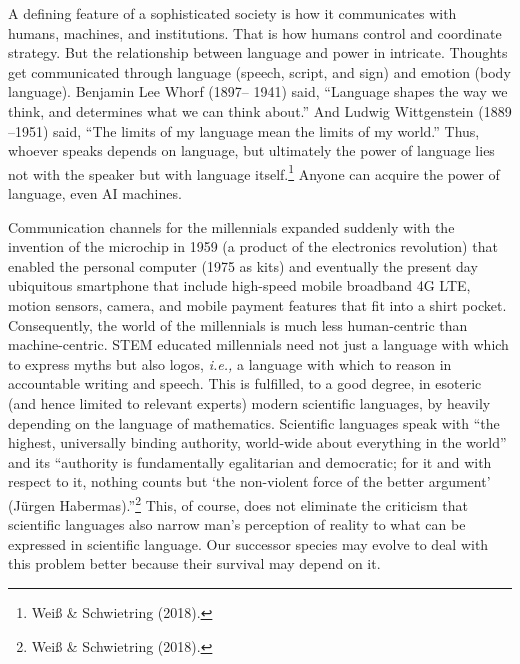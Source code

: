 \begin{multicols}{2}
A defining feature of a sophisticated society is how it communicates with humans, machines, and institutions. That is how humans control and coordinate strategy. But the relationship between language and power in intricate. Thoughts get communicated through language (speech, script, and sign) and emotion (body language). Benjamin Lee Whorf (1897– 1941) said, “Language shapes the way we think, and determines what we can think about.” And Ludwig Wittgenstein (1889 –1951) said, “The limits of my language mean the limits of my world.” Thus, whoever speaks depends on language, but ultimately the power of language lies not with the speaker but with language itself.\footnote{Weiß \& Schwietring (2018).}  Anyone can acquire the power of language, even AI machines.

Communication channels for the millennials expanded suddenly with the invention of the microchip in 1959 (a product of the electronics revolution) that enabled the personal computer (1975 as kits) and eventually the present day ubiquitous smartphone that include high-speed mobile broadband 4G LTE, motion sensors, camera, and mobile payment features that fit into a shirt pocket. Consequently, the world of the millennials is much less human-centric than machine-centric. STEM educated millennials need not just a language with which to express myths but also logos, \textit{i.e.,} a language with
which to reason in accountable writing and speech. This is fulfilled, to a good degree, in esoteric (and hence limited to relevant experts) modern scientific languages, by heavily depending on the language of mathematics. Scientific languages speak with “the highest, universally binding authority, world-wide about everything in the world” and its “authority is fundamentally egalitarian and democratic; for it and with respect to it, nothing counts but ‘the non-violent force of the better argument’ (Jürgen Habermas).”\footnote{Weiß \& Schwietring (2018).}  This, of course, does not eliminate the criticism that scientific languages also narrow man's perception of reality to what can be expressed in scientific language. Our successor species may evolve to deal with this problem better because their survival may depend on it. 


\end{multicols}
